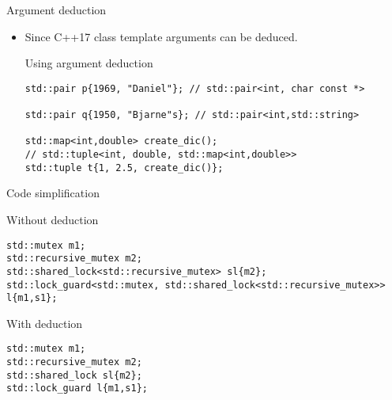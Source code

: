 \begin{frame}[t,fragile]{Argument deduction}
\begin{itemize}
  \item Since C++17 class template arguments can be deduced.

\begin{block}{Using argument deduction}
\begin{lstlisting}
std::pair p{1969, "Daniel"}; // std::pair<int, char const *>

std::pair q{1950, "Bjarne"s}; // std::pair<int,std::string>

std::map<int,double> create_dic();
// std::tuple<int, double, std::map<int,double>>
std::tuple t{1, 2.5, create_dic()};
\end{lstlisting}
\end{block}

\end{itemize}
\end{frame}

\begin{frame}[t,fragile]{Code simplification}

\begin{block}{Without deduction}
\begin{lstlisting}
std::mutex m1;
std::recursive_mutex m2;
std::shared_lock<std::recursive_mutex> sl{m2};
std::lock_guard<std::mutex, std::shared_lock<std::recursive_mutex>> l{m1,s1};
\end{lstlisting}
\end{block}

\begin{block}{With deduction}
\begin{lstlisting}
std::mutex m1;
std::recursive_mutex m2;
std::shared_lock sl{m2};
std::lock_guard l{m1,s1};
\end{lstlisting}
\end{block}

\end{frame}
